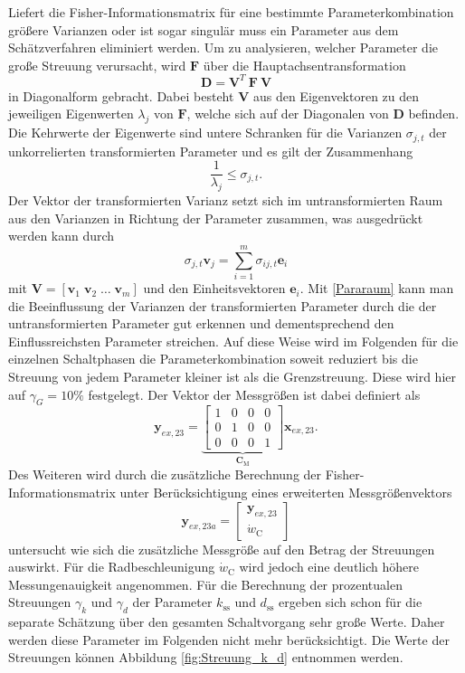 Liefert die Fisher-Informationsmatrix für eine bestimmte Parameterkombination   größere Varianzen oder ist sogar singulär muss ein Parameter aus dem Schätzverfahren eliminiert werden. Um zu analysieren, welcher Parameter die große Streuung verursacht, wird $\pmb{F}$ über die Hauptachsentransformation
\begin{equation}
\pmb{D} = \pmb{V}^T\ \pmb{F}\ \pmb{V}
\end{equation} 
in Diagonalform gebracht. Dabei besteht $\pmb{V}$ aus den Eigenvektoren zu den jeweiligen Eigenwerten $\lambda_j$ von $\pmb{F}$, welche sich auf der Diagonalen von $\pmb{D}$ befinden. Die Kehrwerte der Eigenwerte sind untere Schranken für die  Varianzen $\sigma_{j,t}$ der unkorrelierten transformierten Parameter und es gilt der Zusammenhang
\begin{equation}
\frac{1}{\lambda_j}\leq \sigma_{j,t}.
\end{equation}
Der Vektor der transformierten Varianz setzt sich im untransformierten Raum aus den Varianzen in Richtung der Parameter zusammen, was ausgedrückt werden kann durch
\begin{equation}\label{Pararaum}
\sigma_{j,t} \pmb{v}_j = \sum_{i=1}^m \sigma_{ij,t} \pmb{e}_i
\end{equation}
mit $\pmb{V} = [\pmb{v}_1\; \pmb{v}_2\; \dots \;\pmb{v}_m]$ und den Einheitsvektoren $\pmb{e}_i$. Mit \eqref{Pararaum} kann man die Beeinflussung der Varianzen der transformierten Parameter durch die der untransformierten Parameter gut erkennen und dementsprechend den Einflussreichsten Parameter streichen. Auf diese Weise wird im Folgenden für die einzelnen Schaltphasen die Parameterkombination soweit reduziert bis die Streuung von jedem Parameter kleiner ist als die Grenzstreuung. Diese wird hier auf $\gamma_{G}=10\%$ festgelegt.
Der Vektor der Messgrößen ist dabei definiert als
\begin{equation}\label{eq:yex23}
\pmb{y}_{ex,23} = \underbrace{\begin{bmatrix} 1 & 0 & 0 & 0\\ 0 & 1 & 0 & 0\\ 0 & 0 & 0 & 1\end{bmatrix}}_{\pmb{C}_\mathrm{M}} \pmb{x}_{ex,23}.
\end{equation} 
Des Weiteren wird durch die zusätzliche Berechnung der Fisher-Informationsmatrix unter Berücksichtigung eines erweiterten Messgrößenvektors
\begin{equation}
\pmb{y}_{ex,23a} = \begin{bmatrix} \pmb{y}_{ex,23} \\ \dot{w}_\mathrm{C} \end{bmatrix}
\end{equation}
untersucht wie sich die zusätzliche Messgröße auf den Betrag der Streuungen auswirkt. Für die Radbeschleunigung $\dot{w}_\mathrm{C}$ wird jedoch eine deutlich höhere Messungenauigkeit angenommen. Für die Berechnung der prozentualen Streuungen $\gamma_k$ und $\gamma_d$ der Parameter $k_\mathrm{ss}$ und $d_\mathrm{ss}$ ergeben sich schon für die separate Schätzung über den gesamten Schaltvorgang sehr große Werte. Daher werden diese Parameter im Folgenden nicht mehr berücksichtigt. Die Werte der Streuungen können Abbildung \ref{fig:Streuung_k_d} entnommen werden.

